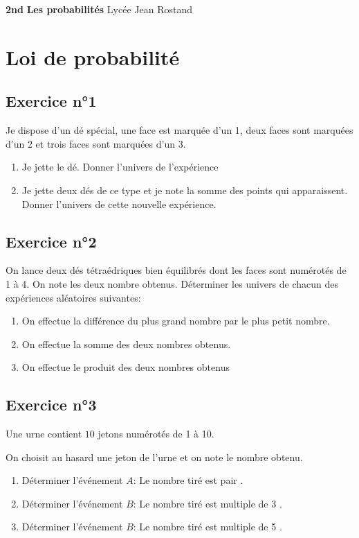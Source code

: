 \documentclass[12pt,a4paper]{article}
\begin{document}
\textbf{2nd} \hfill \textbf{Les probabilités} \hfill Lycée Jean Rostand\\
\trait 

\section{Loi de probabilité}
\subsection*{Exercice n°1}

Je dispose d'un dé spécial, une face est marquée d'un 1, deux faces sont marquées d'un 2 et trois faces sont marquées d'un 3.

\begin{enumerate}
    \item Je jette le dé. Donner l'univers de l'expérience
    \item Je jette deux dés de ce type et je note la somme des points qui apparaissent. Donner l'univers de cette nouvelle expérience.
\end{enumerate}

\subsection*{Exercice n°2}

On lance deux dés tétraédriques bien équilibrés dont les faces sont numérotés de 1 à 4. On note les deux nombre obtenus. Déterminer les univers de chacun des expériences aléatoires suivantes: 


\begin{enumerate}
    \item On effectue la différence du plus grand nombre par le plus petit nombre.
    \item On effectue la somme des deux nombres obtenus.
    \item On effectue le produit des deux nombres obtenus
\end{enumerate}


\subsection*{Exercice n°3}


Une urne contient $10$ jetons numérotés de 1 à 10.

On choisit au hasard une jeton de l'urne et on note le nombre obtenu.

\begin{enumerate}
    \item Déterminer l'événement $A$: \og Le nombre tiré est pair \fg{}.
    \item Déterminer l'événement $B$: \og Le nombre tiré est multiple de 3 \fg{}.
    \item Déterminer l'événement $B$: \og Le nombre tiré est multiple de 5 \fg{}.
\end{enumerate}
\end{document}
